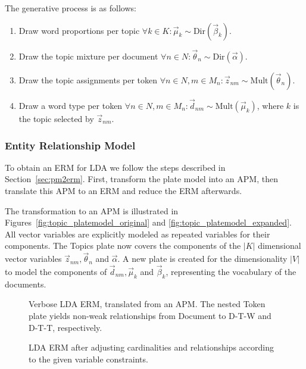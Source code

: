 The generative process is as follows:
\begin{enumerate}
\item Draw word proportions per topic $\forall k \in K: \vec \mu_k \sim \text{Dir}(\vec \beta_k)$.
\item Draw the topic mixture per document $\forall n \in N: \vec \theta_n \sim \text{Dir}(\vec \alpha)$.
\item Draw the topic assignments per token $\forall n \in N, m \in M_n: \vec z_{nm} \sim \text{Mult}(\vec \theta_n)$.
\item Draw a word type per token $\forall n \in N, m \in M_n: \vec d_{nm} \sim \text{Mult}(\vec \mu_k)$, where $k$ is the topic selected by $\vec z_{nm}$.
\end{enumerate}

\subsubsection{Entity Relationship Model}

To obtain an ERM for LDA we follow the steps described in Section~\ref{sec:pm2erm}. First, transform the plate model into an APM, then translate this APM to an ERM and reduce the ERM afterwards.

The transformation to an APM is illustrated in Figures~\ref{fig:topic_platemodel_original} and \ref{fig:topic_platemodel_expanded}. All vector variables are explicitly modeled as repeated variables for their components. The Topics plate now covers the components of the $|K|$ dimensional vector variables $\vec z_{nm}, \vec \theta_n$ and $\vec \alpha$. A new plate is created for the dimensionality $|V|$ to model the components of $\vec d_{nm}, \vec \mu_k$ and $\vec \beta_k$, representing the vocabulary of the documents.

\begin{figure}[p]
\centering
\scalebox{0.5}{\adjustTikzSize }
\caption[Verbose LDA ERM, translated from an APM]{Verbose LDA ERM, translated from an APM. The nested Token plate yields non-weak relationships from Document to D-T-W and D-T-T, respectively.}\label{fig:topic_erm_good_verbose}
\end{figure}

\begin{figure}[p]
\centering
\scalebox{0.5}{\adjustTikzSize }
\caption[LDA ERM after taking constraints into account]{LDA ERM after adjusting cardinalities and relationships according to the given variable constraints.}\label{fig:topic_erm_good_constraints}
\end{figure}

